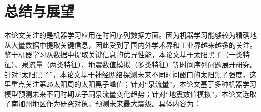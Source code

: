 \chapter{总结与展望}\label{chap:conclusion}


本论文关注的是机器学习应用在时间序列数据方面。因为机器学习能够较为精确地从大量数据中提取关键信息，因此受到了国内外学术界和工业界越来越多的关注。鉴于机器学习从数据中提取关键信息的优异性能，本论文基于太阳黑子（一类特征）、泉流量（两类特征）、地震数值模拟（多类特征）等时间序列问题展开研究。针对“太阳黑子”，本论文基于神经网络探测未来不同时间窗口的太阳黑子强度，这里重点关注第25太阳周的太阳黑子峰值；针对“泉流量”，本论文基于多种机器学习模型预测未来不同时期龙子祠泉流量变化趋势；针对“地震数值模拟”，本论文选取了南加州地区作为研究对象，预测未来最大震级。具体内容为：
